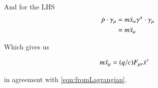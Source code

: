 \documentclass{article}
\begin{document}
And for the LHS
\begin{align*}
\dot{p} \cdot \gamma_\mu &= m \ddot{x}_\alpha \gamma^\alpha \cdot \gamma_\mu \\
&= m \ddot{x}_\mu 
\end{align*}

Which gives us

\begin{align}
m \ddot{x}_\mu &= (q/c) F_{\mu\nu} \dot{x}^\nu
\end{align}

in agreement with \ref{eqn:fromLagrangian}.

\end{document}
